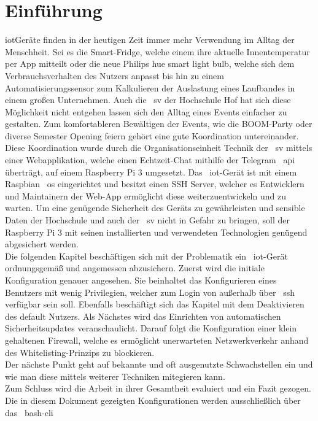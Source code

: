 
\section{Einführung}\label{sec:einfuhrung}
\gls{iot}Geräte finden in der heutigen Zeit immer mehr Verwendung im Alltag der Menschheit.
Sei es die Smart-Fridge, welche einem ihre aktuelle Innentemperatur per App mitteilt oder die neue Philips hue smart light bulb,
welche sich dem Verbrauchsverhalten des Nutzers anpasst bis hin zu einem Automatisierungssensor zum Kalkulieren der Auslastung eines Laufbandes in einem großen Unternehmen.
Auch die ~\gls{sv} der Hochschule Hof hat sich diese Möglichkeit nicht entgehen lassen sich den Alltag eines Events einfacher zu gestalten.
Zum komfortableren Bewältigen der Events, wie die BOOM-Party oder diverse Semester Opening feiern gehört eine gute Koordination untereinander.
Diese Koordination wurde durch die Organisationseinheit Technik der ~\gls{sv} mittels einer Webapplikation, welche einen Echtzeit-Chat mithilfe der Telegram ~\gls{api} überträgt, auf einem Raspberry Pi 3 umgesetzt.
Das ~\gls{iot}-Gerät ist mit einem Raspbian ~\gls{os} eingerichtet und besitzt einen SSH Server, welcher es Entwicklern und Maintainern der Web-App ermöglicht diese weiterzuentwickeln und zu warten.
Um eine genügende Sicherheit des Geräts zu gewährleisten und sensible Daten der Hochschule und auch der ~\gls{sv} nicht in Gefahr zu bringen, soll der Raspberry Pi 3 mit seinen installierten und verwendeten Technologien genügend
abgesichert werden.\\
\blankline
Die folgenden Kapitel beschäftigen sich mit der Problematik ein ~\gls{iot}-Gerät ordnungsgemäß und angemessen abzusichern.
Zuerst wird die initiale Konfiguration genauer angesehen.
Sie beinhaltet das Konfigurieren eines Benutzers mit wenig Privilegien, welcher zum Login von außerhalb über ~\gls{ssh} verfügbar sein soll.
Ebenfalls beschäftigt sich das Kapitel mit dem Deaktivieren des default Nutzers.
Als Nächstes wird das Einrichten von automatischen Sicherheitsupdates veranschaulicht.
Darauf folgt die Konfiguration einer klein gehaltenen Firewall, welche es ermöglicht unerwarteten Netzwerkverkehr anhand des Whitelisting-Prinzips zu blockieren.\\
Der nächste Punkt geht auf bekannte und oft ausgenutzte Schwachstellen ein und wie man diese mittels weiterer Techniken mitegieren kann. \\
Zum Schluss wird die Arbeit in ihrer Gesamtheit evaluiert und ein Fazit gezogen. \\
Die in diesem Dokument gezeigten Konfigurationen werden ausschließlich über das ~\gls{bash}-\gls{cli}